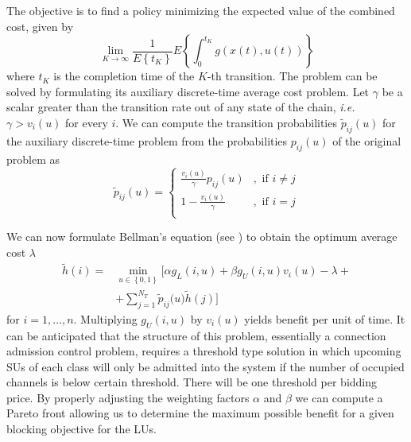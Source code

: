 The objective is to find a policy minimizing the expected value of the combined cost, given by
\begin{equation}	 \lim_{K\rightarrow\infty}\frac{1}{E\left\{t_{K}\right\}}
E\left\{\int^{t_{K}}_{0}g\left(x(t),u(t)\right)\right\}
\end{equation}
where $t_{K}$ is the completion time of the $K$-th transition. The problem can be solved by formulating its auxiliary discrete-time average cost problem. Let $\gamma$ be a scalar greater than the transition rate out of any state of the chain, \textit{i.e.} $\gamma > v_{i}(u)$ for every $i$.
We can compute the transition probabilities $\tilde{p}_{ij}(u)$ for the auxiliary discrete-time problem from the probabilities $p_{ij}(u)$ of the original problem as
\begin{equation}
	  \tilde{p}_{ij}(u) =
	  \begin{cases}
		\frac{v_{i}(u)}{\gamma}p_{ij}(u) &, \text{ if }i \neq j\\	
		1- \frac{v_{i}(u)}{\gamma}&, \text{ if }i = j \\
 \end{cases}
\end{equation}

We can now formulate Bellman's equation (see \cite{ref:Bertsekas}) to obtain the optimum average cost $\lambda$
\begin{equation}\label{BellmanEqAuction}
\begin{array}{ll}
\tilde{h}\left(i\right) = & \min_{u\in \left\{0,1\right\}}\biggl[\alpha g_{L}(i,u) + \beta g_{U}(i,u)v_{i}(u) -
 \lambda + \\
 & + \displaystyle\sum_{j=1}^{N_{T}}\tilde{p}_{ij}\bigl(u\bigr)\tilde{h}\left(j\right)\biggr]
\end{array}
\end{equation}
for $i =1,\ldots,n$. Multiplying $g_{U}(i,u)$ by $v_{i}(u)$ yields benefit per unit of time.
It can be anticipated that the structure of this problem, essentially a connection admission control problem, requires a threshold type solution in which upcoming SUs of each class will only be admitted into the system if the number of occupied channels is below certain threshold. There will be one threshold per bidding price. By properly adjusting the weighting factors $\alpha$ and $\beta$ we can compute a Pareto front allowing us to determine the maximum possible benefit for a given blocking objective for the LUs.
 
